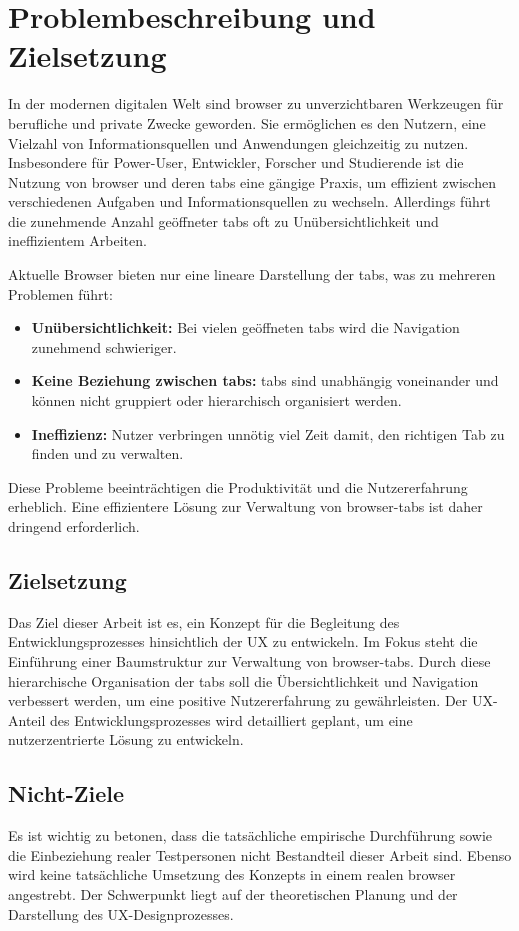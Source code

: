 \section{Problembeschreibung und Zielsetzung}
In der modernen digitalen Welt sind \gls{browser} zu unverzichtbaren Werkzeugen für berufliche und private Zwecke geworden. 
Sie ermöglichen es den Nutzern, eine Vielzahl von Informationsquellen und Anwendungen gleichzeitig zu nutzen. 
Insbesondere für Power-User, Entwickler, Forscher und Studierende ist die Nutzung von \gls{browser} und deren \gls{tab}s eine gängige Praxis, um effizient zwischen verschiedenen Aufgaben und Informationsquellen zu wechseln. 
Allerdings führt die zunehmende Anzahl geöffneter \gls{tab}s oft zu Unübersichtlichkeit und ineffizientem Arbeiten.

Aktuelle Browser bieten nur eine lineare Darstellung der \gls{tab}s, was zu mehreren Problemen führt:
\begin{itemize}
    \item \textbf{Unübersichtlichkeit:} Bei vielen geöffneten \gls{tab}s wird die Navigation zunehmend schwieriger.
    \item \textbf{Keine Beziehung zwischen \gls{tab}s:} \gls{tab}s sind unabhängig voneinander und können nicht gruppiert oder hierarchisch organisiert werden.
    \item \textbf{Ineffizienz:} Nutzer verbringen unnötig viel Zeit damit, den richtigen Tab zu finden und zu verwalten.
\end{itemize}
Diese Probleme beeinträchtigen die Produktivität und die Nutzererfahrung erheblich. 
Eine effizientere Lösung zur Verwaltung von \gls{browser}-\gls{tab}s ist daher dringend erforderlich.

\subsection{Zielsetzung}
Das Ziel dieser Arbeit ist es, ein Konzept für die Begleitung des Entwicklungsprozesses hinsichtlich der \ac{UX} zu entwickeln. 
Im Fokus steht die Einführung einer Baumstruktur zur Verwaltung von \gls{browser}-\gls{tab}s. 
Durch diese hierarchische Organisation der \gls{tab}s soll die Übersichtlichkeit und Navigation verbessert werden, um eine positive Nutzererfahrung zu gewährleisten. 
Der \ac{UX}-Anteil des Entwicklungsprozesses wird detailliert geplant, um eine nutzerzentrierte Lösung zu entwickeln.

\subsection{Nicht-Ziele}
Es ist wichtig zu betonen, dass die tatsächliche empirische Durchführung sowie die Einbeziehung realer Testpersonen nicht Bestandteil dieser Arbeit sind. 
Ebenso wird keine tatsächliche Umsetzung des Konzepts in einem realen \gls{browser} angestrebt. 
Der Schwerpunkt liegt auf der theoretischen Planung und der Darstellung des \ac{UX}-Designprozesses.
